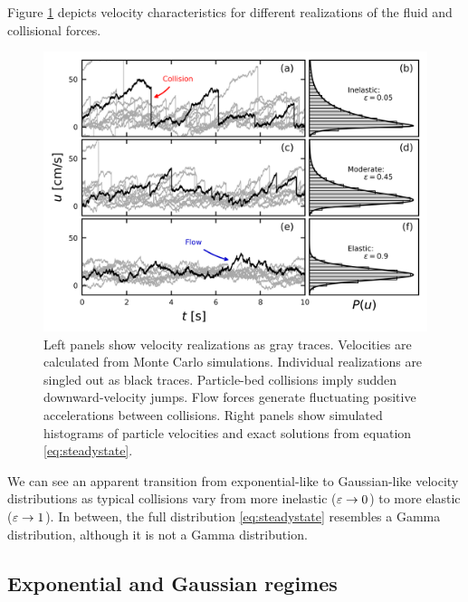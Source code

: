 Figure \ref{fig:fig2} depicts velocity characteristics for different realizations of the fluid and collisional forces.
\begin{figure}
	\centerline{\includegraphics{./figures/ch5/Fig2pdfs.png}}
	\caption{Left panels show velocity realizations as gray traces. Velocities are calculated from Monte Carlo simulations. Individual realizations are singled out as black traces. Particle-bed collisions imply sudden downward-velocity jumps. Flow forces generate fluctuating positive accelerations between collisions. Right panels show simulated histograms of particle velocities and exact solutions from equation \ref{eq:steadystate}.}
	\label{fig:fig2}
\end{figure}
We can see an apparent transition from exponential-like to Gaussian-like velocity distributions as typical collisions vary from more inelastic ($\varepsilon \rightarrow 0$) to more elastic ($\varepsilon \rightarrow 1$). In between, the full distribution \ref{eq:steadystate} resembles a Gamma distribution, although it is not a Gamma distribution.


\subsection{Exponential and Gaussian regimes}
\label{sec:modelcomparison}

